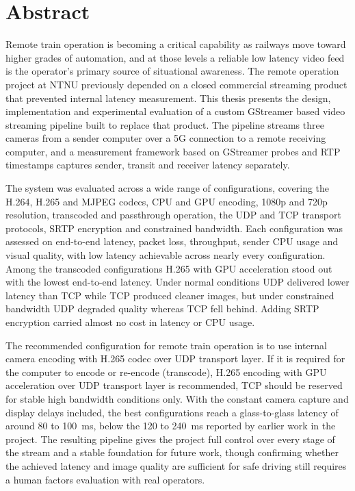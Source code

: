 \section*{Abstract}

Remote train operation is becoming a critical capability as railways move toward higher grades of automation, and at those levels a reliable low latency video feed is the operator's primary source of situational awareness. The remote operation project at NTNU previously depended on a closed commercial streaming product that prevented internal latency measurement. This thesis presents the design, implementation and experimental evaluation of a custom GStreamer based video streaming pipeline built to replace that product. The pipeline streams three cameras from a sender computer over a 5G connection to a remote receiving computer, and a measurement framework based on GStreamer probes and RTP timestamps captures sender, transit and receiver latency separately.

The system was evaluated across a wide range of configurations, covering the H.264, H.265 and MJPEG codecs, CPU and GPU encoding, 1080p and 720p resolution, transcoded and passthrough operation, the UDP and TCP transport protocols, SRTP encryption and constrained bandwidth. Each configuration was assessed on end-to-end latency, packet loss, throughput, sender CPU usage and visual quality, with low latency achievable across nearly every configuration. Among the transcoded configurations H.265 with GPU acceleration stood out with the lowest end-to-end latency. Under normal conditions UDP delivered lower latency than TCP while TCP produced cleaner images, but under constrained bandwidth UDP degraded quality whereas TCP fell behind. Adding SRTP encryption carried almost no cost in latency or CPU usage.

The recommended configuration for remote train operation is to use internal camera encoding with H.265 codec over UDP transport layer. If it is required for the computer to encode or re-encode (transcode), H.265 encoding with GPU acceleration over UDP transport layer is recommended, TCP should be reserved for stable high bandwidth conditions only. With the constant camera capture and display delays included, the best configurations reach a glass-to-glass latency of around 80 to 100~ms, below the 120 to 240~ms reported by earlier work in the project. The resulting pipeline gives the project full control over every stage of the stream and a stable foundation for future work, though confirming whether the achieved latency and image quality are sufficient for safe driving still requires a human factors evaluation with real operators.

